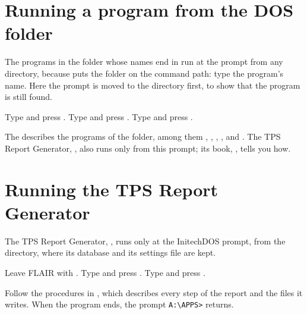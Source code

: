 \section{Running a program from the DOS folder}
The programs in the  folder whose names end in  run at
the prompt from any directory, because  puts the folder on
the command path: type the program's name.  Here the prompt is moved to the
 directory first, to show that the program is still found.
\begin{TaskSteps}
\Step Type  and press .
\Step Type  and press .
\Step Type  and press .
\end{TaskSteps}


The  describes the programs of the
 folder, among them , ,
, ,  and .  The TPS Report
Generator, , also runs only from this prompt; its book,
, tells you how.

\section{Running the TPS Report Generator}
The TPS Report Generator, , runs only at the InitechDOS
prompt, from the  directory, where its database 
and its settings file  are kept.
\begin{TaskSteps}
\Step Leave FLAIR with .
\Step Type  and press .
\Step Type  and press .
\end{TaskSteps}


Follow the procedures in , which describes every step of the report and the files it
writes.  When the program ends, the prompt \texttt{A:\textbackslash APPS>}
returns.

